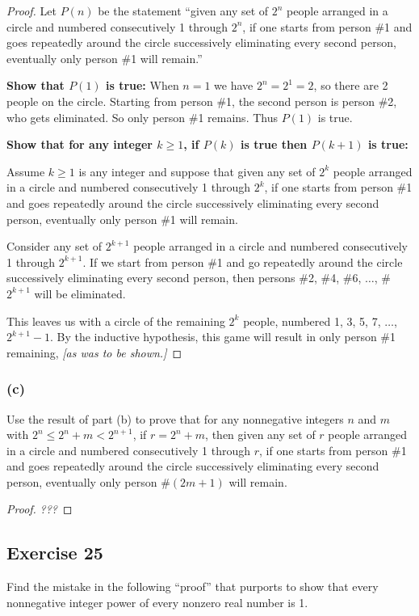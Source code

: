 \documentclass[14pt]{extarticle}
\begin{document}
\begin{proof}
    Let $P(n)$ be the statement ``given any set of $2^n$ people arranged in a circle and numbered consecutively 1 through
    $2^n$, if one starts from person \#1 and goes repeatedly around the circle successively eliminating every second
    person, eventually only person \#1 will remain.''

    {\bf Show that $P(1)$ is true:} When $n = 1$ we have $2^n = 2^1 = 2$, so there are 2 people on the circle.
    Starting from person \#1, the second person is person \#2, who gets eliminated. So only person \#1 remains.
    Thus $P(1)$ is true.

        {\bf Show that for any integer $k \geq 1$, if $P(k)$ is true then $P(k+1)$ is true:}

    Assume $k \geq 1$ is any integer and suppose that given any set of $2^k$ people arranged in a circle and numbered
    consecutively 1 through $2^k$, if one starts from person \#1 and goes repeatedly around the circle successively
    eliminating every second person, eventually only person \#1 will remain.

    Consider any set of $2^{k+1}$ people arranged in a circle and numbered consecutively 1 through $2^{k+1}$.
    If we start from person \#1 and go repeatedly around the circle successively eliminating every second person,
    then persons \#2, \#4, \#6, $\ldots$, \#$2^{k+1}$ will be eliminated.

    This leaves us with a circle of the remaining $2^k$ people, numbered 1, 3, 5, 7, $\ldots$, $2^{k+1}-1$.
    By the inductive hypothesis, this game will result in only person \#1 remaining, {\it [as was to be shown.]}
\end{proof}

\subsubsection{(c)}
Use the result of part (b) to prove that for any nonnegative integers $n$ and $m$ with $2^n \leq 2^n + m < 2^{n+1}$,
if $r = 2^n + m$, then given any set of $r$ people arranged in a circle and numbered consecutively 1 through $r$,
if one starts from person \#1 and goes repeatedly around the circle successively eliminating every second person, eventually only person \#$(2m + 1)$ will remain.

\begin{proof}
    {\it ???}
\end{proof}

\subsection{Exercise 25}
Find the mistake in the following “proof” that purports to show that every nonnegative integer power of every nonzero real number is 1.
\end{document}
